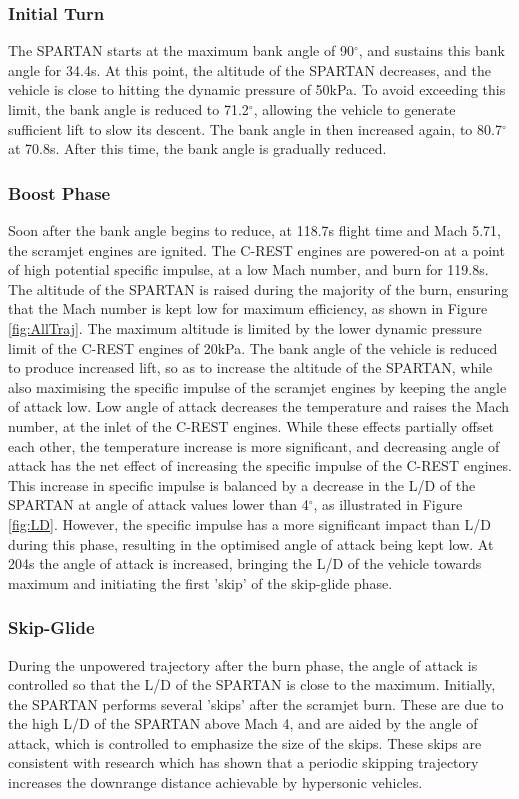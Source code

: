 \subsubsection{ Initial Turn}
The SPARTAN starts at the maximum bank angle of 90$^\circ$, and sustains this bank angle for 34.4s. At this point, the altitude of the SPARTAN decreases, and the vehicle is close to hitting the dynamic pressure of 50kPa. To avoid exceeding this limit, the bank angle is reduced to 71.2$^\circ$, allowing the vehicle to generate sufficient lift to slow its descent. The bank angle in then increased again, to 80.7$^\circ$ at 70.8s. After this time, the bank angle is gradually reduced. 

\subsubsection{ Boost Phase}
Soon after the bank angle begins to reduce, at 118.7s flight time and Mach 5.71, the scramjet engines are ignited. The C-REST engines are powered-on at a point of high potential specific impulse, at a low Mach number, and burn for 119.8s. The altitude of the SPARTAN is raised during the majority of the burn, ensuring that the Mach number is kept low for maximum efficiency\cite{Preller2017}, as shown in Figure \ref{fig:AllTraj}. The maximum altitude is limited by the lower dynamic pressure limit of the C-REST engines of 20kPa. The bank angle of the vehicle is reduced to produce increased lift, so as to increase the altitude of the SPARTAN, while also maximising the specific impulse of the scramjet engines by keeping the angle of attack low. Low angle of attack decreases the temperature and raises the Mach number, at the inlet of the C-REST engines. While these effects partially offset each other\cite{Preller2017}, the temperature increase is more significant, and decreasing angle of attack has the net effect of increasing the specific impulse of the C-REST engines. This increase in specific impulse is balanced by a decrease in the L/D of the SPARTAN at angle of attack values lower than 4$^\circ$, as illustrated in Figure \ref{fig:LD}. However, the specific impulse has a more significant impact than L/D during this phase, resulting in the optimised angle of attack being kept low. At 204s the angle of attack is increased, bringing the L/D of the vehicle towards maximum and initiating the first 'skip' of the skip-glide phase.  


\subsubsection{ Skip-Glide}
During the unpowered trajectory after the burn phase, the angle of attack is controlled so that the L/D of the SPARTAN is close to the maximum. Initially, the SPARTAN performs several 'skips' after the scramjet burn. These are due to the high L/D of the SPARTAN above Mach 4, and are aided by the angle of attack, which is controlled to emphasize the size of the skips. These skips are consistent with research which has shown that a periodic skipping trajectory increases the downrange distance achievable by hypersonic vehicles\cite{Eggers1957,Kanda2007}. 


